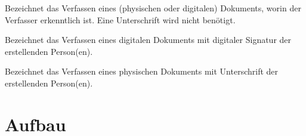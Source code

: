 \documentclass[%
	parskip=half,
]{scrartcl}
\begin{document}

Bezeichnet das Verfassen eines (physischen oder digitalen) Dokuments, worin der Verfasser erkenntlich ist. Eine
Unterschrift wird nicht benötigt.


Bezeichnet das Verfassen eines digitalen Dokuments mit digitaler Signatur der erstellenden Person(en).


Bezeichnet das Verfassen eines physischen Dokuments mit Unterschrift der erstellenden Person(en).

\clearpage

\appendix

\section{Aufbau}
\end{document}
